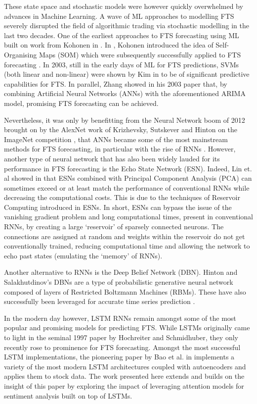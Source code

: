 \documentclass{article}
\begin{document}
These state space and stochastic models were however quickly overwhelmed by advances in Machine Learning. A wave of ML approaches to modelling FTS severely disrupted the field of algorithmic trading via stochastic modelling in the last two decades. One of the earliest approaches to FTS forecasting using ML built on work from Kohonen in \cite{kohonen1982self}. In \cite{kohonen1982self}, Kohonen introduced the idea of Self-Organising Maps (SOM) which were subsequently successfully applied to FTS forecasting \cite{koskela1998time}. In 2003, still in the early days of ML for FTS predictions, SVMs (both linear and non-linear) were shown by Kim in \cite{kim2003financial} to be of significant  predictive capabilities for FTS. In parallel, Zhang showed in his 2003 paper \cite{zhang2003time} that, by combining Artificial Neural Networks (ANNs) with the aforementioned ARIMA model, promising FTS forecasting can be achieved. 

Nevertheless, it was only by benefitting from the Neural Network boom of 2012 brought on by the AlexNet work of Krizhevsky, Sutskever and Hinton on the ImageNet competition \cite{krizhevsky2012imagenet}, that ANNs became some of the most mainstream methods for FTS forecasting, in particular with the rise of RNNs \cite{chandra2012cooperative}. However, another type of neural network that has also been widely lauded for its performance in FTS forecasting is the Echo State Network (ESN). Indeed, Lin et. al showed in \cite{lin2009short} that ESNs combined with Principal Component Analysis (PCA) can sometimes exceed or at least match the performance of conventional RNNs while decreasing the computational costs. This is due to the techniques of Reservoir Computing introduced in ESNs. In short, ESNs can bypass the issue of the vanishing gradient problem and long computational times, present in conventional RNNs, by creating a large `reservoir' of sparsely connected neurons. The connections are assigned at random and weights within the reservoir do not get conventionally trained, reducing computational time and allowing the network to echo past states (emulating the `memory' of RNNs).  

Another alternative to RNNs is the Deep Belief Network (DBN). Hinton and Salakhutdinov's DBNs are a type of probabilistic generative neural network composed of layers of Restricted Boltzmann Machines (RBMs). These have also successfully been leveraged for accurate time series prediction \cite{kuremoto2014time}.

In the modern day however, LSTM RNNs remain amongst some of the most popular and promising models for predicting FTS. While LSTMs originally came to light in the seminal 1997 paper \cite{hochreiter1997long} by Hochreiter and Schmidhuber, they only recently rose to prominence for FTS forecasting. Amongst the most successful LSTM implementations, the pioneering paper by Bao et al. in \cite{bao2017deep} implements a variety of the most modern LSTM architectures coupled with autoencoders and applies them to stock data. The work presented here extends and builds on the insight of this paper by exploring the impact of leveraging attention models for sentiment analysis built on top of LSTMs. 
\end{document}
